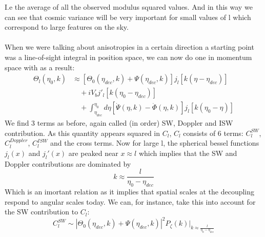 \documentclass{article}
\begin{document}
I.e the average of all the observed modulus squared values. And in this way we can see that cosmic variance will be very important for small values of l which correspond to large features on the sky.\\\\
When we were talking about anisotropies in a certain direction a starting point was a line-of-sight integral in position space, we can now do one in momentum space with as a result:
\begin{align}
  \Theta_l(\eta_0,k) &\approx \left[\Theta_0(\eta_{dec},k) + \Psi(\eta_{dec},k)\right]j_l\left[k(\eta-\eta_{dec})\right] \\
  &\quad + iV_b j'_l\left[k(\eta_0-\eta_{dec})\right]\\
  &\quad + \int_{\eta_{dec}}^{\eta_0} d\eta\left[\dot{\Psi}(\eta,k) - \dot{\Phi}(\eta,k)\right]j_l\left[k(\eta_0-\eta)\right]
\end{align}
We find 3 terms as before, again called (in order) SW, Doppler and ISW contribution. As this quantity appears squared in $C_l$, $C_l$ consists of 6 terms: $C_l^{SW}$, $C_l^{Doppler}$, $C_l^{ISW}$ and the cross terms. Now for large l, the spherical bessel functions $j_l(x)$ and $j_l'(x)$ are peaked near $x\approx l$ which implies that the SW and Doppler contributions are dominated by
\begin{equation}
  k \approx \frac{l}{\eta_0 - \eta_{dec}}
\end{equation}
Which is an imortant relation as it implies that spatial scales at the decoupling respond to angular scales today.
We can, for instance, take this into account for the SW contribution to $C_l$:
\begin{equation}
  C_l^{SW} \sim \left|\Theta_0(\eta_{dec},k) + \Psi(\eta_{dec},k)\right|^2 P_\zeta (k)\big|_{k \approx \frac{l}{\eta_0 - \eta_{dec}}}
\end{equation}
\newpage
\end{document}
